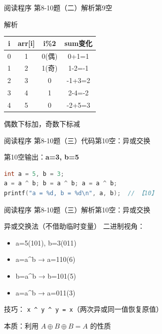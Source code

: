 \begin{frame}{阅读程序 第8-10题（二）解析}{第9空}
    \begin{alertblock}{解析}
        \footnotesize
        \begin{tabular}{c|c|c|c}
            i & arr[i] & i\%2 & sum变化 \\ \hline
            0 & 1 & 0(偶) & 0+1=1 \\
            1 & 2 & 1(奇) & 1-2=-1 \\
            2 & 3 & 0 & -1+3=2 \\
            3 & 4 & 1 & 2-4=-2 \\
            4 & 5 & 0 & -2+5=3
        \end{tabular}

        偶数下标加，奇数下标减
    \end{alertblock}
\end{frame}

\begin{frame}[fragile]{阅读程序 第8-10题（三）代码}{第10空：异或交换}
    \begin{exampleblock}{第10空输出：\textbf{a=3, b=5}}
    \end{exampleblock}
    \begin{lstlisting}[language=C]
int a = 5, b = 3;
a = a ^ b; b = a ^ b; a = a ^ b;
printf("a = %d, b = %d\n", a, b);  // 【10】
\end{lstlisting}
\end{frame}

\begin{frame}{阅读程序 第8-10题（三）解析}{第10空：异或交换}
    \begin{alertblock}{异或交换法（不借助临时变量）}
        \small 二进制视角：
        \begin{itemize}
            \setlength{\itemsep}{0pt}
            \item a=5(101), b=3(011)
            \item a=a\^{}b → a=110(6)
            \item b=a\^{}b → b=101(5)
            \item a=a\^{}b → a=011(3)
        \end{itemize}
        {\color{highlight}技巧：} \texttt{x \^{} y \^{} y = x}（两次异或同一值恢复原值）

        本质：利用 $A \oplus B \oplus B = A$ 的性质
    \end{alertblock}
\end{frame}
